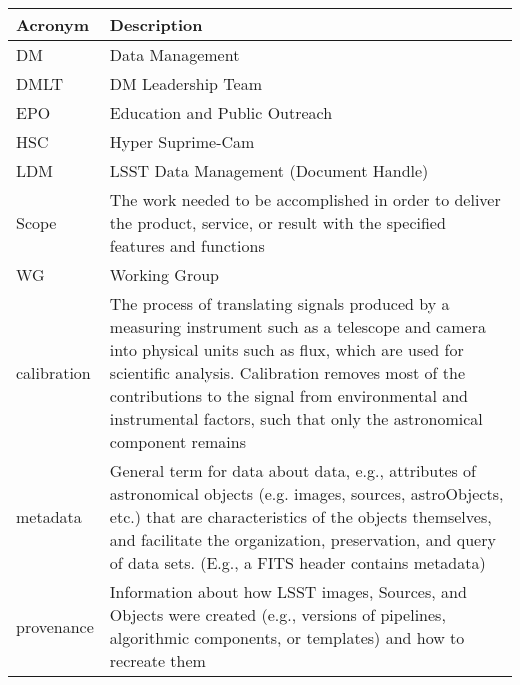 \addtocounter{table}{-1}
\begin{longtable}{|p{}|p{}|}\hline
\textbf{Acronym} & \textbf{Description}  \\\hline

DM & \gls{Data Management} \\\hline
DMLT & \gls{DM} Leadership Team \\\hline
EPO & \gls{Education and Public Outreach} \\\hline
HSC & Hyper Suprime-Cam \\\hline
LDM & \gls{LSST} \gls{Data Management} (\gls{Document} \gls{Handle}) \\\hline
Scope & The work needed to be accomplished in order to deliver the product, service, or result with the specified features and functions \\\hline
WG & Working Group \\\hline
calibration & The process of translating signals produced by a measuring instrument such as a telescope and \gls{camera} into physical units such as \gls{flux}, which are used for scientific analysis. Calibration removes most of the contributions to the signal from environmental and instrumental factors, such that only the astronomical component remains \\\hline
metadata & General term for data about data, e.g., attributes of astronomical objects (e.g. images, sources, astroObjects, etc.) that are characteristics of the objects themselves, and facilitate the organization, preservation, and query of data sets. (E.g., a \gls{FITS} header contains \gls{metadata}) \\\hline
provenance & Information about how \gls{LSST} images, Sources, and Objects were created (e.g., versions of pipelines, algorithmic components, or templates) and how to recreate them \\\hline
\end{longtable}
